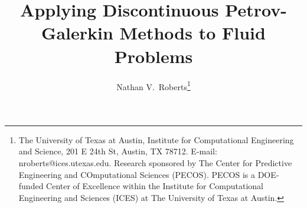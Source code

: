\documentclass{siamltex}
\title{Applying Discontinuous Petrov-Galerkin Methods to Fluid Problems}
\author{
Nathan V.\ Roberts\thanks{The University of Texas at Austin,
Institute for Computational Engineering and Science,
201 E 24th St,
Austin, TX 78712. E-mail: nroberts@ices.utexas.edu.  Research sponsored by The Center for Predictive Engineering and COmputational Sciences (PECOS). PECOS is a DOE-funded Center of Excellence within the Institute for Computational Engineering and Sciences (ICES) at The University of Texas at Austin.} }
\begin{document}
\maketitle

\begin{abstract}
\end{abstract}


\end{document}
